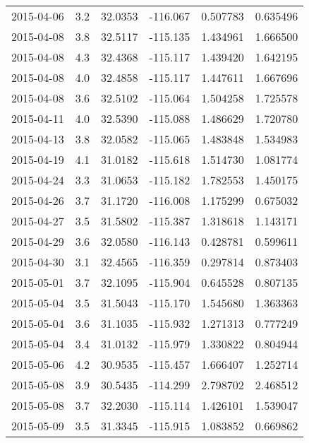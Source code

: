 \begin{tabular}{lrrrrr}
2015-04-06 &       3.2 &  32.0353 &  -116.067 &         0.507783 &         0.635496 \\
2015-04-08 &       3.8 &  32.5117 &  -115.135 &         1.434961 &         1.666500 \\
2015-04-08 &       4.3 &  32.4368 &  -115.117 &         1.439420 &         1.642195 \\
2015-04-08 &       4.0 &  32.4858 &  -115.117 &         1.447611 &         1.667696 \\
2015-04-08 &       3.6 &  32.5102 &  -115.064 &         1.504258 &         1.725578 \\
2015-04-11 &       4.0 &  32.5390 &  -115.088 &         1.486629 &         1.720780 \\
2015-04-13 &       3.8 &  32.0582 &  -115.065 &         1.483848 &         1.534983 \\
2015-04-19 &       4.1 &  31.0182 &  -115.618 &         1.514730 &         1.081774 \\
2015-04-24 &       3.3 &  31.0653 &  -115.182 &         1.782553 &         1.450175 \\
2015-04-26 &       3.7 &  31.1720 &  -116.008 &         1.175299 &         0.675032 \\
2015-04-27 &       3.5 &  31.5802 &  -115.387 &         1.318618 &         1.143171 \\
2015-04-29 &       3.6 &  32.0580 &  -116.143 &         0.428781 &         0.599611 \\
2015-04-30 &       3.1 &  32.4565 &  -116.359 &         0.297814 &         0.873403 \\
2015-05-01 &       3.7 &  32.1095 &  -115.904 &         0.645528 &         0.807135 \\
2015-05-04 &       3.5 &  31.5043 &  -115.170 &         1.545680 &         1.363363 \\
2015-05-04 &       3.6 &  31.1035 &  -115.932 &         1.271313 &         0.777249 \\
2015-05-04 &       3.4 &  31.0132 &  -115.979 &         1.330822 &         0.804944 \\
2015-05-06 &       4.2 &  30.9535 &  -115.457 &         1.666407 &         1.252714 \\
2015-05-08 &       3.9 &  30.5435 &  -114.299 &         2.798702 &         2.468512 \\
2015-05-08 &       3.7 &  32.2030 &  -115.114 &         1.426101 &         1.539047 \\
2015-05-09 &       3.5 &  31.3345 &  -115.915 &         1.083852 &         0.669862 \\

\end{tabular}
